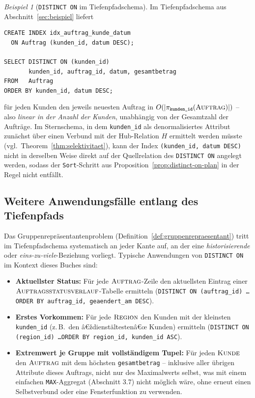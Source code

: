 ﻿\documentclass[a4paper,12pt]{report}
\theoremstyle{definition}
\theoremstyle{remark}
\newtheorem{example}{Beispiel}[chapter]
\begin{document}
\begin{example}[\texttt{DISTINCT ON} im Tiefenpfadschema]
\label{ex:distinct-on-tiefenpfad}
Im Tiefenpfadschema aus Abschnitt~\ref{sec:beispiel} liefert
\begin{lstlisting}
CREATE INDEX idx_auftrag_kunde_datum
  ON Auftrag (kunden_id, datum DESC);

SELECT DISTINCT ON (kunden_id)
       kunden_id, auftrag_id, datum, gesamtbetrag
FROM   Auftrag
ORDER BY kunden_id, datum DESC;
\end{lstlisting}
für jeden Kunden den jeweils neuesten Auftrag in
$O(|\pi_{\texttt{kunden\_id}}(\textsc{Auftrag})|)$ -- also
\emph{linear in der Anzahl der Kunden}, unabhängig von der
Gesamtzahl der Aufträge. Im Sternschema, in dem
\texttt{kunden\_id} als denormalisiertes Attribut zunächst über
einen Verbund mit der Hub-Relation $H$ ermittelt werden müsste (vgl.\
Theorem~\ref{thm:selektivitaet}), kann der Index
\texttt{(kunden\_id, datum DESC)} nicht in derselben Weise direkt auf
der Quellrelation des \texttt{DISTINCT ON} angelegt werden, sodass der
\texttt{Sort}-Schritt aus Proposition~\ref{prop:distinct-on-plan} in
der Regel nicht entfällt.
\end{example}

\subsection{Weitere Anwendungsfälle entlang des Tiefenpfads}

Das Gruppenrepräsentantenproblem (Definition~\ref{def:gruppenrepraesentant})
tritt im Tiefenpfadschema systematisch an jeder Kante auf, an der eine
\emph{historisierende} oder \emph{eins-zu-viele}-Beziehung vorliegt.
Typische Anwendungen von \texttt{DISTINCT ON} im Kontext dieses Buches
sind:

\begin{itemize}
  \item \textbf{Aktuellster Status:} Für jede
    $\textsc{Auftrag}$-Zeile den aktuellsten Eintrag einer
    $\textsc{Auftragsstatusverlauf}$-Tabelle ermitteln
    (\texttt{DISTINCT ON (auftrag\_id) \ldots ORDER BY auftrag\_id,
    geaendert\_am DESC}).
  \item \textbf{Erstes Vorkommen:} Für jede $\textsc{Region}$ den
    Kunden mit der kleinsten \texttt{kunden\_id} (z.\,B.\ den
    â€ždienstältestenâ€œ Kunden) ermitteln
    (\texttt{DISTINCT ON (region\_id) \ldots ORDER BY region\_id,
    kunden\_id ASC}).
  \item \textbf{Extremwert je Gruppe mit vollständigem Tupel:}
    Für jeden $\textsc{Kunde}$ den $\textsc{Auftrag}$ mit dem
    höchsten \texttt{gesamtbetrag} -- inklusive aller übrigen
    Attribute dieses Auftrags, nicht nur des Maximalwerts selbst, was
    mit einem einfachen \texttt{MAX}-Aggregat (Abschnitt 3.7) nicht
    möglich wäre, ohne erneut einen Selbstverbund oder eine
    Fensterfunktion zu verwenden.
\end{itemize}
\end{document}
